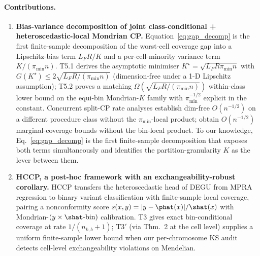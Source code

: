 \paragraph{Contributions.}
\begin{enumerate}
    \item \textbf{Bias-variance decomposition of joint class-conditional + heteroscedastic-local Mondrian CP.}
    Equation~\eqref{eq:gap_decomp} is the first finite-sample decomposition of the worst-cell coverage gap into a Lipschitz-bias term $L_F R / K$ and a per-cell-minority variance term $K / (\pi_{\min} n)$. T5.1 derives the asymptotic minimiser $K^\star = \sqrt{L_F R \pi_{\min} n}$ with $G(K^\star) \leq 2\sqrt{L_F R / (\pi_{\min} n)}$ (dimension-free under a 1-D Lipschitz assumption); T5.2 proves a matching $\Omega(\sqrt{L_F R/(\pi_{\min} n)})$ within-class lower bound on the equi-bin Mondrian-$K$ family with $\pi_{\min}^{-1/2}$ explicit in the constant. Concurrent split-CP rate analyses \citep{yao2026nonasymp} establish dim-free $O(n^{-1/2})$ on a different procedure class without the $\pi_{\min}$-local product; \citet{xie2025imbalancedcp} obtain $O(n^{-1/2})$ marginal-coverage bounds without the bin-local product. To our knowledge, Eq.~\eqref{eq:gap_decomp} is the first finite-sample decomposition that exposes both terms simultaneously and identifies the partition-granularity $K$ as the lever between them.

    \item \textbf{HCCP, a post-hoc framework with an exchangeability-robust corollary.}
    HCCP transfers the heteroscedastic head of DEGU \citep{zhou2026degu} from MPRA regression to binary variant classification with finite-sample local coverage, pairing a nonconformity score $s(x,y) = |y - \phat(x)| / \shat(x)$ with Mondrian-$(y \times \shat\text{-bin})$ calibration. T3 gives exact bin-conditional coverage at rate $1/(n_{k,b}+1)$; T3$'$ (via \citet{barber2023exchangeability} Thm.~2 at the cell level) supplies a uniform finite-sample lower bound when our per-chromosome KS audit detects cell-level exchangeability violations on Mendelian.


\end{enumerate}
